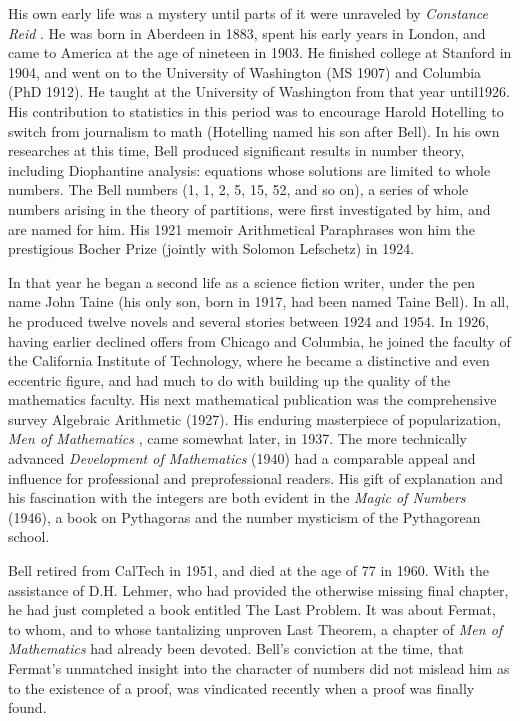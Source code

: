 \documentclass[10pt,letter]{article}
\begin{document}
His own early life was a mystery until parts of it were unraveled by
\emph{Constance Reid} . He was born in Aberdeen in 1883, spent his early
years in London, and came to America at the age of nineteen in 1903. He
finished college at Stanford in 1904, and went on to the University of
Washington (MS 1907) and Columbia (PhD 1912). He taught at the
University of Washington from that year until1926. His contribution to
statistics in this period was to encourage Harold Hotelling to switch
from journalism to math (Hotelling named his son after Bell). In his own
researches at this time, Bell produced significant results in number
theory, including Diophantine analysis: equations whose solutions are
limited to whole numbers. The Bell numbers (1, 1, 2, 5, 15, 52, and so
on), a series of whole numbers arising in the theory of partitions, were
first investigated by him, and are named for him. His 1921 memoir
Arithmetical Paraphrases won him the prestigious Bocher Prize (jointly
with Solomon Lefschetz) in 1924.

In that year he began a second life as a science fiction writer, under
the pen name John Taine (his only son, born in 1917, had been named
Taine Bell). In all, he produced twelve novels and several stories
between 1924 and 1954. In 1926, having earlier declined offers from
Chicago and Columbia, he joined the faculty of the California Institute
of Technology, where he became a distinctive and even eccentric figure,
and had much to do with building up the quality of the mathematics
faculty. His next mathematical publication was the comprehensive survey
Algebraic Arithmetic (1927). His enduring masterpiece of popularization,
\emph{Men of Mathematics} , came somewhat later, in 1937. The more
technically advanced \emph{Development of Mathematics} (1940) had a
comparable appeal and influence for professional and preprofessional
readers. His gift of explanation and his fascination with the integers
are both evident in the \emph{Magic of Numbers} (1946), a book on
Pythagoras and the number mysticism of the Pythagorean school.

Bell retired from CalTech in 1951, and died at the age of 77 in 1960.
With the assistance of D.H. Lehmer, who had provided the otherwise
missing final chapter, he had just completed a book entitled The Last
Problem. It was about Fermat, to whom, and to whose tantalizing unproven
Last Theorem, a chapter of \emph{Men of Mathematics} had already been
devoted. Bell's conviction at the time, that Fermat's unmatched insight
into the character of numbers did not mislead him as to the existence of
a proof, was vindicated recently when a proof was finally found.
\end{document}
